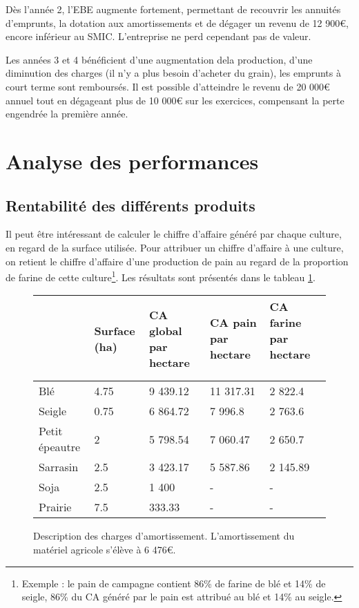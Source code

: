 \documentclass{book}
\begin{document}
Dès l'année 2, l'EBE augmente fortement, permettant de recouvrir les annuités d'emprunts, la dotation aux amortissements et de dégager un revenu de 12 900\euro{}, encore inférieur au SMIC. L'entreprise ne perd cependant pas de valeur.

Les années 3 et 4 bénéficient d'une augmentation dela production, d'une diminution des charges (il n'y a plus besoin d'acheter du grain), les emprunts à court terme sont remboursés. Il est possible d'atteindre le revenu de 20 000\euro{} annuel tout en dégageant plus de 10 000\euro{} sur les exercices, compensant la perte engendrée la première année.

\section{Analyse des performances}

\subsection{Rentabilité des différents produits}

Il peut être intéressant de calculer le chiffre d'affaire généré par chaque culture, en regard de la surface utilisée. Pour attribuer un chiffre d'affaire à une culture, on retient le chiffre d'affaire d'une production de pain au regard de la proportion de farine de cette culture\footnote{Exemple : le pain de campagne contient 86\% de farine de blé et 14\% de seigle, 86\%  du CA généré par le pain est attribué au blé et 14\% au seigle.}. Les résultats sont présentés dans le tableau \ref{tab:renta_prod}.

\begin{figure}[h!]
\footnotesize
\center
\begin{tabular}{ | p{2cm} | p{1.5cm}| p{1.8cm}| p{1.8cm}| p{1.8cm}| }
\hline
	& Surface (ha) & CA global par hectare & CA pain par hectare & CA farine par hectare \  \\ \hline
	Blé & 4.75 & 9 439.12 & 11 317.31 & 2 822.4 \\ \hline
	Seigle & 0.75 & 6 864.72 & 7 996.8 & 2 763.6 \\ \hline
	Petit épeautre & 2 & 5 798.54 & 7 060.47 & 2 650.7 \\ \hline
	Sarrasin & 2.5 & 3 423.17 & 5 587.86 & 2 145.89 \\ \hline
	Soja & 2.5 & 1 400 & - & - \\ \hline
	Prairie & 7.5 & 333.33 & - & - \\ \hline
\end{tabular}
\caption{Description des charges d'amortissement. L'amortissement du matériel agricole s'élève à 6 476\euro{}.}
\label{tab:renta_prod}
\end{figure}
\end{document}
